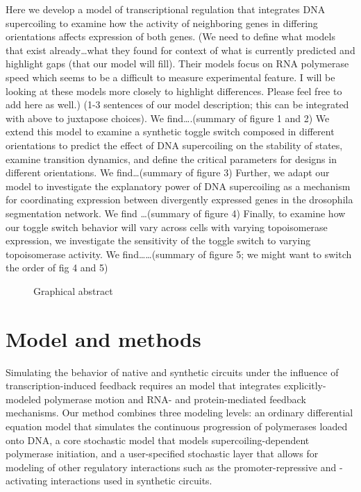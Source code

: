 \documentclass[11pt]{article}
\begin{document}
Here we develop a model of transcriptional regulation that integrates DNA supercoiling to examine how the activity of neighboring genes in differing orientations affects expression of both genes.
(We need to define what models that exist already…what they found for context of what is currently predicted and highlight gaps (that our model will fill). Their models focus on RNA polymerase speed which seems to be a difficult to measure experimental feature. I will be looking at these models more closely to highlight differences. Please feel free to add here as well.)
(1-3 sentences of our model description; this can be integrated with above to juxtapose choices).
We find….(summary of figure 1 and 2)
We extend this model to examine a synthetic toggle switch composed in different orientations to predict the effect of DNA supercoiling on the stability of states, examine transition dynamics, and define the critical parameters for designs in different orientations. We find…(summary of figure 3)
Further, we adapt our model to investigate the explanatory power of DNA supercoiling as a mechanism for coordinating expression between divergently expressed genes in the drosophila segmentation network. We find …(summary of figure 4)
Finally, to examine how our toggle switch behavior will vary across cells with varying topoisomerase expression, we investigate the sensitivity of the toggle switch to varying topoisomerase activity. We find……(summary of figure 5; we might want to switch the order of fig 4 and 5)

\begin{figure}[h]
    \centering
    \caption{Graphical abstract} \label{fig:graphical_abstract}
\end{figure}

\section{Model and methods}
Simulating the behavior of native and synthetic circuits under the influence of transcription-induced feedback requires an model that integrates explicitly-modeled polymerase motion and RNA- and protein-mediated feedback mechanisms.
Our method combines three modeling levels: an ordinary differential equation model that simulates the continuous progression of polymerases loaded onto DNA, a core stochastic model that models supercoiling-dependent polymerase initiation, and a user-specified stochastic layer that allows for modeling of other regulatory interactions such as the promoter-repressive and -activating interactions used in synthetic circuits.
\end{document}
